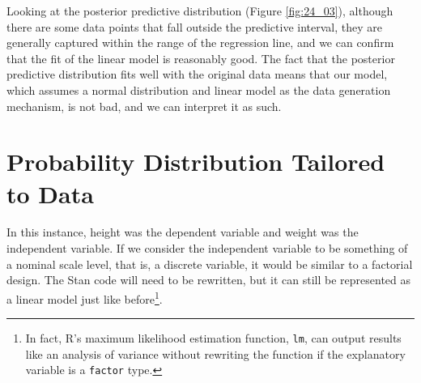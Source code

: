 \documentclass{ltjsbook}
\begin{document}
Looking at the posterior predictive distribution (Figure \ref{fig:24_03}), although there are some data points that fall outside the predictive interval, they are generally captured within the range of the regression line, and we can confirm that the fit of the linear model is reasonably good.
The fact that the posterior predictive distribution fits well with the original data means that our model, which assumes a normal distribution and linear model as the data generation mechanism, is not bad, and we can interpret it as such.


\section{Probability Distribution Tailored to Data}
In this instance, height was the dependent variable and weight was the independent variable. If we consider the independent variable to be something of a nominal scale level, that is, a discrete variable, it would be similar to a factorial design. The Stan code will need to be rewritten, but it can still be represented as a linear model just like before\footnote{In fact, R's maximum likelihood estimation function, \verb|lm|, can output results like an analysis of variance without rewriting the function if the explanatory variable is a \verb|factor| type.}.
\end{document}

